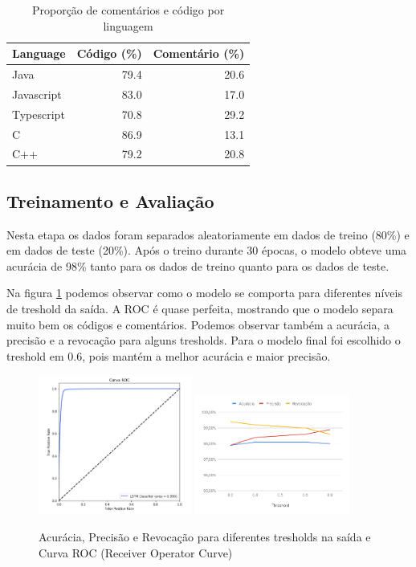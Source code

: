\documentclass[12pt]{article}
\begin{document}
\begin{table}[ht]
  \centering
  \caption{Proporção de comentários e código por linguagem}
  \label{tab:prop2}
  \begin{tabular}{lrr}
    Language & Código (\%) & Comentário (\%)\\[0.5ex]
    \hline
    Java & 79.4 & 20.6 \\[0.5ex]
    Javascript & 83.0	& 17.0 \\[0.5ex]
    Typescript & 70.8 & 29.2 \\[0.5ex]
    C	& 86.9 & 13.1 \\[0.5ex]
    C++ & 79.2 &	20.8 \\[0.5ex]
    \hline
  \end{tabular}
\end{table}

\subsection{Treinamento e Avaliação}

Nesta etapa os dados foram separados aleatoriamente em dados de treino (80\%)
e em dados de teste (20\%). Após o treino durante 30 épocas, o modelo obteve uma
acurácia de 98\% tanto para os dados de treino quanto para os dados de teste.

Na figura \ref{fig:tresh} podemos observar como o modelo se comporta para diferentes
níveis de treshold da saída. A ROC é quase perfeita, mostrando que o modelo separa 
muito bem os códigos e comentários. Podemos observar também a acurácia, a precisão
e a revocação para alguns tresholds. Para o modelo final foi escolhido o treshold em 0.6,
pois mantém a melhor acurácia e maior precisão.

\begin{figure}[ht]
  \centering
  \includegraphics[width=0.45\textwidth]{../images/roc06.png}
  \includegraphics[width=0.45\textwidth]{../images/chart-tresh.png}
  \caption{Acurácia, Precisão e Revocação para diferentes tresholds na saída 
  e Curva ROC (Receiver Operator Curve) }
  \label{fig:tresh}
\end{figure}
\end{document}
